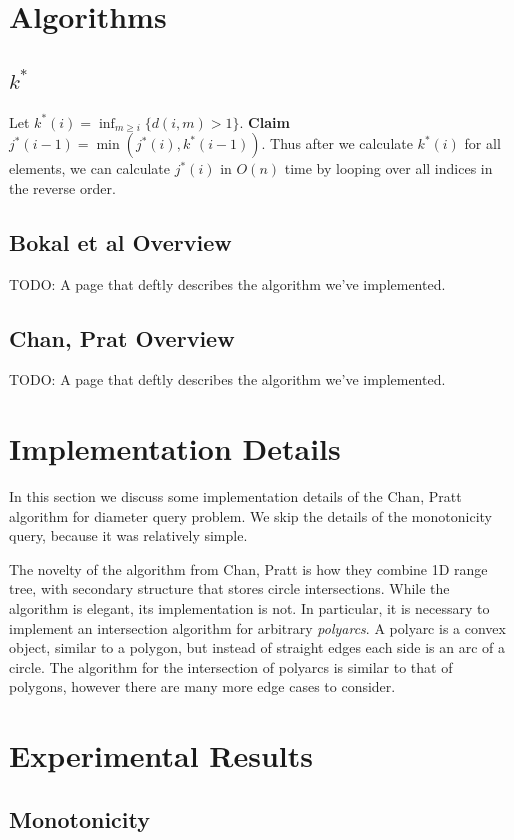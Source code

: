 \documentclass{article}
\begin{document}
\section{Algorithms}
\subsection{$k^*$}

Let $k^*(i) = \inf_{m \geq i} \{d(i, m) > 1\}$. \textbf{Claim} $j^*(i-1) = \min(j^*(i), k^*(i-1))$. Thus after we calculate $k^*(i)$ for all elements, we can calculate $j^*(i)$ in $O(n)$ time by looping over all indices in the reverse order.

\subsection{Bokal et al Overview}
TODO: A page that deftly describes the algorithm we've implemented.

\subsection{Chan, Prat Overview}
TODO: A page that deftly describes the algorithm we've implemented.

\section{Implementation Details}
In this section we discuss some implementation details of the Chan, Pratt algorithm for diameter query problem. We skip the details of the monotonicity query, because it was relatively simple.

The novelty of the algorithm from Chan, Pratt is how they combine 1D range tree, with secondary structure that stores circle intersections. While the algorithm is elegant, its implementation is not. In particular, it is necessary to implement an intersection algorithm for arbitrary \textit{polyarcs}. A polyarc is a convex object, similar to a polygon, but instead of straight edges each side is an arc of a circle. The algorithm for the intersection of polyarcs is similar to that of polygons, however there are many more edge cases to consider.

\section{Experimental Results}

\subsection{Monotonicity}
\end{document}
